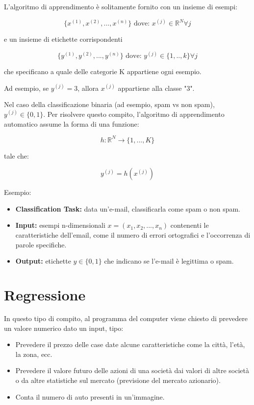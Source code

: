\noindent
L'algoritmo di apprendimento è solitamente fornito con un insieme di esempi:

$$ \{x^{(1)}, x^{(2)}, ..., x^{(n)}\} \text{ dove: } x^{(j)} \in \mathbb{R}^{N} \forall j$$

\noindent
e un insieme di etichette corrispondenti

$$ \{y^{(1)}, y^{(2)}, ..., y^{(n)}\} \text{ dove: } y^{(j)} \in \{1,..,k\}\forall j$$

\noindent
che specificano a quale delle categorie K appartiene ogni esempio.

Ad esempio, se $y^{(j)} = 3$, allora $x^{(j)} $ appartiene alla classe "3".

Nel caso della classificazione binaria (ad esempio, spam vs non spam), $y^{(j)} \in \{0,1\} $. Per risolvere questo compito, l'algoritmo di apprendimento automatico assume la forma di una funzione:

$$ h: \mathbb{R}^{N} \rightarrow \{1, ... ,K\} $$

\noindent
tale che:

$$y^{(j)} = h(x^{(j)})$$

\noindent
Esempio:

\begin{itemize}
    \item \textbf{Classification Task:} data un'e-mail, classificarla come spam o non spam.
    \item \textbf{Input:} esempi n-dimensionali $ x = (x_1, x_2, ..., x_n)$ contenenti le caratteristiche dell'email, come il numero di errori ortografici e l'occorrenza di parole specifiche.
    \item \textbf{Output:} etichette $y \in \{0,1\}$ che indicano se l'e-mail è legittima o spam.
\end{itemize}

\section{Regressione}

In questo tipo di compito, al programma del computer viene chiesto di prevedere un valore numerico dato un input, tipo:
\begin{itemize}
    \item Prevedere il prezzo delle case date alcune caratteristiche come la città, l'età, la zona, ecc.
    \item Prevedere il valore futuro delle azioni di una società dai valori di altre società o da altre statistiche sul mercato (previsione del mercato azionario).
    \item Conta il numero di auto presenti in un'immagine.
\end{itemize}

